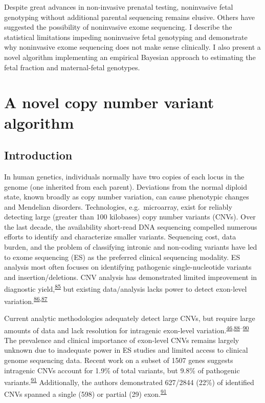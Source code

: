 \documentclass[11pt,letterpaper,oneside]{book}
\begin{document}
Despite great advances in non-invasive prenatal testing, noninvasive fetal genotyping without additional parental sequencing remains elusive.
Others have suggested the possibility of noninvasive exome sequencing.
I describe the statistical limitations impeding noninvasive fetal genotyping and demonstrate why noninvasive exome sequencing does not make sense clinically.
I also present a novel algorithm implementing an empirical Bayesian approach to estimating the fetal fraction and maternal-fetal genotypes.

\hypertarget{mcCNV}{%
\chapter{A novel copy number variant algorithm}\label{mcCNV}}

\hypertarget{introduction}{%
\section{Introduction}\label{introduction}}

In human genetics, individuals normally have two copies of each locus in the genome (one inherited from each parent).
Deviations from the normal diploid state, known broadly as copy number variation, can cause phenotypic changes and Mendelian disorders.
Technologies, e.g.~microarray, exist for reliably detecting large (greater than 100 kilobases) copy number variants (CNVs).
Over the last decade, the availability short-read DNA sequencing compelled numerous efforts to identify and characterize smaller variants.
Sequencing cost, data burden, and the problem of classifying intronic and non-coding variants have led to exome sequencing (ES) as the preferred clinical sequencing modality.
ES analysis most often focuses on identifying pathogenic single-nucleotide variants and insertion/deletions.
CNV analysis has demonstrated limited improvement in diagnostic yield,\textsuperscript{\protect\hyperlink{ref-marchuk:2018aa}{85}} but existing data/analysis lacks power to detect exon-level variation.\textsuperscript{\protect\hyperlink{ref-retterer:2015aa}{86},\protect\hyperlink{ref-yao:2017aa}{87}}

Current analytic methodologies adequately detect large CNVs, but require large amounts of data and lack resolution for intragenic exon-level variation.\textsuperscript{\protect\hyperlink{ref-plagnol:2012aa}{46},\protect\hyperlink{ref-fromer:2012aa}{88}--\protect\hyperlink{ref-krumm:2012aa}{90}}
The prevalence and clinical importance of exon-level CNVs remains largely unknown due to inadequate power in ES studies and limited access to clinical genome sequencing data.
Recent work on a subset of 1507 genes suggests intragenic CNVs account for 1.9\% of total variants, but 9.8\% of pathogenic variants.\textsuperscript{\protect\hyperlink{ref-truty:2019aa}{91}}
Additionally, the authors demonstrated 627/2844 (22\%) of identified CNVs spanned a single (598) or partial (29) exon.\textsuperscript{\protect\hyperlink{ref-truty:2019aa}{91}}
\end{document}
